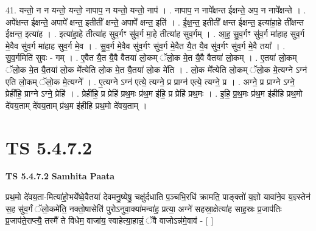 \documentclass[17pt]{extarticle}
\begin{document}
41. यन्तो॒ न न यन्तो॒ यन्तो॒ नापाप॒ न यन्तो॒ यन्तो॒ नाप॑ । . नापाप॒ न नापे᳚क्षन्त ईक्षन्ते॒ अप॒ न नापे᳚क्षन्ते । . अपे᳚क्षन्त ईक्षन्ते॒ अपापे᳚ क्षन्त॒ इतीती᳚ क्षन्ते॒ अपापे᳚ क्षन्त॒ इति॑ । . ई॒क्ष॒न्त॒ इतीती᳚ क्षन्त ईक्षन्त॒ इत्या॑हा॒हे ती᳚क्षन्त ईक्षन्त॒ इत्या॑ह । . इत्या॑हा॒हे तीत्या॑ह सुव॒र्गꣳ सु॑व॒र्ग मा॒हे तीत्या॑ह सुव॒र्गम् । . आ॒ह॒ सु॒व॒र्गꣳ सु॑व॒र्ग मा॑हाह सुव॒र्ग मे॒वैव सु॑व॒र्ग मा॑हाह सुव॒र्ग मे॒व । . सु॒व॒र्ग मे॒वैव सु॑व॒र्गꣳ सु॑व॒र्ग मे॒वैत यै॒त यै॒व सु॑व॒र्गꣳ सु॑व॒र्ग मे॒वै तया᳚ । . सु॒व॒र्गमिति॑ सुवः - गम् । . ए॒वैत यै॒त यै॒वै वैतया॑ लो॒कम् ॅलो॒क मे॒त यै॒वै वैतया॑ लो॒कम् । . ए॒तया॑ लो॒कम् ॅलो॒क मे॒त यै॒तया॑ लो॒क मे᳚त्येति लो॒क मे॒त यै॒तया॑ लो॒क मे॑ति । . लो॒क मे᳚त्येति लो॒कम् ॅलो॒क मे॒त्यग्ने ऽग्न॑ एति लो॒कम् ॅलो॒क मे॒त्यग्ने᳚ । . ए॒त्यग्ने ऽग्न॑ एत्ये॒ त्यग्ने॒ प्र प्राग्न॑ एत्ये॒ त्यग्ने॒ प्र । . अग्ने॒ प्र प्राग्ने ऽग्ने॒ प्रेही॑हि॒ प्राग्ने ऽग्ने॒ प्रेहि॑ । . प्रेही॑हि॒ प्र प्रेहि॑ प्रथ॒मः प्र॑थ॒म इ॑हि॒ प्र प्रेहि॑ प्रथ॒मः । . इ॒हि॒ प्र॒थ॒मः प्र॑थ॒म इ॑हीहि प्रथ॒मो दे॑वय॒ताम् दे॑वय॒ताम् प्र॑थ॒म इ॑हीहि प्रथ॒मो दे॑वय॒ताम् । \newline
\pagebreak
{}

\section{ TS 5.4.7.2 }

\textbf{TS 5.4.7.2 } \newline
\textbf{Samhita Paata} \newline

प्रथ॒मो दे॑वय॒ता-मित्या॑हो॒भये᳚ष्वे॒वैतया॑ देवमनु॒ष्येषु॒ चक्षु॑र्दधाति प॒ञ्चभि॒रधि॑ क्रामति॒ पाङ्क्तो॑ य॒ज्ञो यावा॑ने॒व य॒ज्ञ्स्तेन॑ स॒ह सु॑व॒र्गं ॅलो॒कमे॑ति॒ नक्तो॒षासेति॑ पुरोऽनुवा॒क्या॑मन्वा॑ह॒ प्रत्या॒ अग्ने॑ सहस्रा॒क्षेत्या॑ह साह॒स्रः प्र॒जाप॑तिः प्र॒जाप॑ते॒राप्त्यै॒ तस्मै॑ ते विधेम॒ वाजा॑य॒ स्वाहेत्या॒हान्नं॒ ॅवै वाजोऽन्न॑मे॒वाव॑ - [  ] \newline
\end{document}
